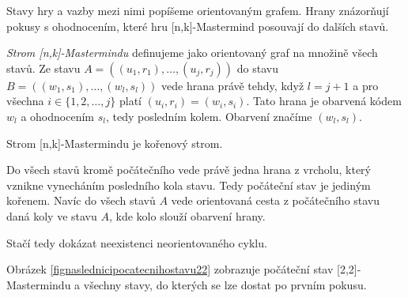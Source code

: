 Stavy hry a vazby mezi nimi popíšeme orientovaným grafem. Hrany znázorňují pokusy s ohodnocením, které hru [n,k]-Mastermind posouvají do dalších stavů. 
\begin{definice}
  \emph{Strom [n,k]-Mastermindu} definujeme jako orientovaný graf na množině všech stavů. Ze stavu $A = \left((u_1, r_1),\dots, (u_j,r_j)\right)$ do stavu $B = \left((w_1, s_1), \dots, (w_l,s_l)\right)$ vede hrana právě tehdy, když $l = j+1$ a pro všechna $ i \in \{1,2,\dots, j\}$ platí $ (u_i, r_i) = (w_i, s_i)$. Tato hrana je obarvená kódem $w_l$ a ohodnocením $s_l$, tedy posledním kolem. Obarvení značíme $(w_l, s_l)$. 
\end{definice}

\begin{pozorovani}
    Strom [n,k]-Mastermindu je kořenový strom.
\end{pozorovani}
\begin{dukaz}
    Do všech stavů kromě počátečního vede právě jedna hrana z vrcholu, který vznikne vynecháním posledního kola stavu. Tedy počáteční stav je jediným kořenem. Navíc do všech stavů $A$ vede orientovaná cesta z počátečního stavu daná koly ve stavu $A$, kde kolo slouží obarvení hrany. 

    Stačí tedy dokázat neexistenci neorientovaného cyklu.

    
\end{dukaz}

Obrázek \ref{fignaslednicipocatecnihostavu22} zobrazuje počáteční stav [2,2]-Mastermindu a všechny stavy, do kterých se lze dostat po prvním pokusu. 


